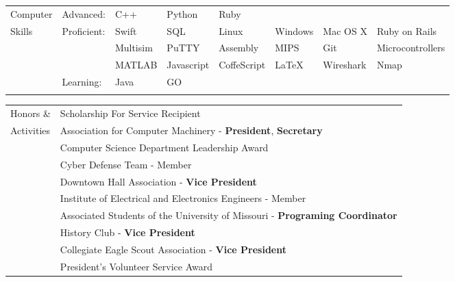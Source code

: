 \documentclass[10.5pt, arial]{article}
\begin{document}
\begin{tabular}{p{1.5cm} l l l l l l l}
Computer	& Advanced: 	& C++ 		& Python 	& Ruby		& 			& 			& 					\\
Skills		& Proficient:	& Swift 	& SQL 		& Linux 	& Windows 	& Mac OS X 	& Ruby on Rails  	\\
			&				& Multisim 	& PuTTY 	& Assembly 	& MIPS 		& Git 		& Microcontrollers  \\
			& 				& MATLAB	& Javascript& CoffeScript& LaTeX	& Wireshark	& Nmap				\\
			& Learning:		& Java 		& GO 		& 			 & 			& 			& 					\\ \\
\end{tabular}

\begin{tabular}{p{1.5cm} l}
Honors \&	& Scholarship For Service Recipient 																		\\
Activities	& Association for Computer Machinery - \textbf{President}, \textbf{Secretary}								\\
			& Computer Science Department Leadership Award 																\\
			& Cyber Defense Team - Member																				\\
			& Downtown Hall Association - \textbf{Vice President}														\\
			& Institute of Electrical and Electronics Engineers - Member													\\
			& Associated Students of the University of Missouri - \textbf{Programing Coordinator} 						\\
			& History Club - \textbf{Vice President} 																	\\
			& Collegiate Eagle Scout Association - \textbf{Vice President} 		 										\\
			& President's Volunteer Service Award																		\\
\end{tabular}
\end{document}
